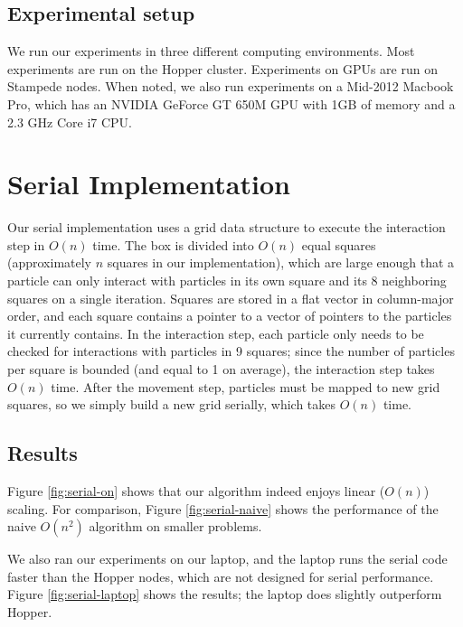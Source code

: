 \documentclass{article}
\begin{document}
\subsection{Experimental setup}
We run our experiments in three different computing environments.  Most experiments are run on the Hopper cluster.  Experiments on GPUs are run on Stampede nodes.  When noted, we also run experiments on a Mid-2012 Macbook Pro, which has an NVIDIA GeForce GT 650M GPU with 1GB of memory and a 2.3 GHz Core i7 CPU.

\section{Serial Implementation}
Our serial implementation uses a grid data structure to execute the interaction step in $O(n)$ time.  The box is divided into $O(n)$ equal squares (approximately $n$ squares in our implementation), which are large enough that a particle can only interact with particles in its own square and its 8 neighboring squares on a single iteration.  Squares are stored in a flat vector in column-major order, and each square contains a pointer to a vector of pointers to the particles it currently contains.  In the interaction step, each particle only needs to be checked for interactions with particles in 9 squares; since the number of particles per square is bounded (and equal to 1 on average), the interaction step takes $O(n)$ time.  After the movement step, particles must be mapped to new grid squares, so we simply build a new grid serially, which takes $O(n)$ time.

\subsection{Results}
Figure \ref{fig:serial-on} shows that our algorithm indeed enjoys linear ($O(n)$) scaling.  For comparison, Figure \ref{fig:serial-naive} shows the performance of the naive $O(n^2)$ algorithm on smaller problems.

We also ran our experiments on our laptop, and the laptop runs the serial code faster than the Hopper nodes, which are not designed for serial performance.  Figure \ref{fig:serial-laptop} shows the results; the laptop does slightly outperform Hopper.
\end{document}
